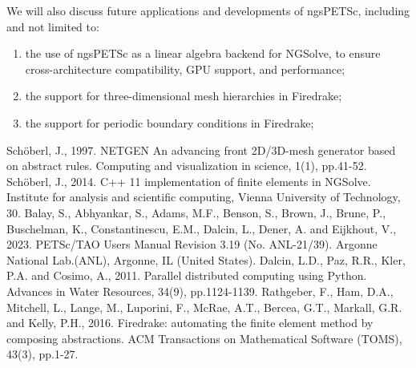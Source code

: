 \documentclass[a4paper,11pt]{article}
\begin{document}
We will also discuss future applications and developments of ngsPETSc, including and not limited to:
\begin{enumerate}
    \item the use of ngsPETSc as a linear algebra backend for NGSolve, to ensure cross-architecture compatibility, GPU support, and performance;
    \item the support for three-dimensional mesh hierarchies in Firedrake;
    \item the support for periodic boundary conditions in Firedrake; 
\end{enumerate}
\begin{thebibliography}{9.}
\frenchspacing
{}Schöberl, J., 1997. NETGEN An advancing front 2D/3D-mesh generator based on abstract rules. Computing and visualization in science, 1(1), pp.41-52.
Schöberl, J., 2014. C++ 11 implementation of finite elements in NGSolve. Institute for analysis and scientific computing, Vienna University of Technology, 30.
Balay, S., Abhyankar, S., Adams, M.F., Benson, S., Brown, J., Brune, P., Buschelman, K., Constantinescu, E.M., Dalcin, L., Dener, A. and Eijkhout, V., 2023. PETSc/TAO Users Manual Revision 3.19 (No. ANL-21/39). Argonne National Lab.(ANL), Argonne, IL (United States).
Dalcin, L.D., Paz, R.R., Kler, P.A. and Cosimo, A., 2011. Parallel distributed computing using Python. Advances in Water Resources, 34(9), pp.1124-1139.
Rathgeber, F., Ham, D.A., Mitchell, L., Lange, M., Luporini, F., McRae, A.T., Bercea, G.T., Markall, G.R. and Kelly, P.H., 2016. Firedrake: automating the finite element method by composing abstractions. ACM Transactions on Mathematical Software (TOMS), 43(3), pp.1-27.
\end{thebibliography}

\end{document}

